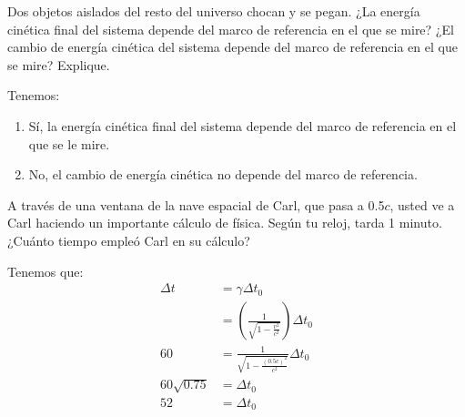 \begin{problema}
    Dos objetos aislados del resto del universo chocan y se pegan. ¿La energía cinética final del sistema depende del marco de referencia en el que se mire? ¿El cambio de energía cinética del sistema depende del marco de referencia en el que se mire? Explique. 
    \begin{sol}
        Tenemos: 
        \begin{enumerate}
            \item Sí, la energía cinética final del sistema depende del marco de referencia en el que se le mire. 
            \item No, el cambio de energía cinética no depende del marco de referencia. 
        \end{enumerate}
        
    \end{sol}
\end{problema}

\begin{problema}
    A través de una ventana de la nave espacial de Carl, que pasa a 0.5$c$, usted ve a Carl haciendo un importante cálculo de física. Según tu reloj, tarda 1 minuto. ¿Cuánto tiempo empleó Carl en su cálculo?
    \begin{sol}
        Tenemos que: 
        \begin{align*}
            \Delta t &= \gamma \Delta t_0\\
                     &= \left(\frac{1}{\sqrt{1-\frac{v^2}{c^2}}}\right)\Delta t_0\\
                    60 &= \frac{1}{\sqrt{1-\frac{(0.5c)^2}{c^2}}}\Delta t_0\\
            60\sqrt{0.75} &= \Delta t_0\\
            52 &= \Delta t_0\\
        \end{align*}
    \end{sol}
\end{problema}

